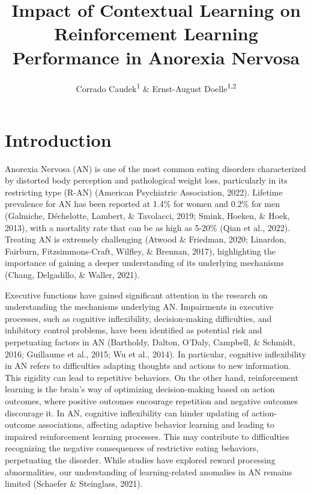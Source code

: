 \documentclass[
  man,floatsintext]{apa6}
\title{Impact of Contextual Learning on Reinforcement Learning Performance in Anorexia Nervosa}
\author{Corrado Caudek\textsuperscript{1} \& Ernst-August Doelle\textsuperscript{1,2}}
\date{}
\affiliation{\vspace{0.5cm}\textsuperscript{1} Wilhelm-Wundt-University\\\textsuperscript{2} Konstanz Business School}
\begin{document}
\maketitle

\hypertarget{introduction}{%
\section{Introduction}\label{introduction}}

Anorexia Nervosa (AN) is one of the most common eating disorders characterized by distorted body perception and pathological weight loss, particularly in its restricting type (R-AN) (American Psychiatric Association, 2022). Lifetime prevalence for AN has been reported at 1.4\% for women and 0.2\% for men (Galmiche, Déchelotte, Lambert, \& Tavolacci, 2019; Smink, Hoeken, \& Hoek, 2013), with a mortality rate that can be as high as 5-20\% (Qian et al., 2022). Treating AN is extremely challenging (Atwood \& Friedman, 2020; Linardon, Fairburn, Fitzsimmons-Craft, Wilfley, \& Brennan, 2017), highlighting the importance of gaining a deeper understanding of its underlying mechanisms (Chang, Delgadillo, \& Waller, 2021).

Executive functions have gained significant attention in the research on understanding the mechanisms underlying AN. Impairments in executive processes, such as cognitive inflexibility, decision-making difficulties, and inhibitory control problems, have been identified as potential risk and perpetuating factors in AN (Bartholdy, Dalton, O'Daly, Campbell, \& Schmidt, 2016; Guillaume et al., 2015; Wu et al., 2014). In particular, cognitive inflexibility in AN refers to difficulties adapting thoughts and actions to new information. This rigidity can lead to repetitive behaviors. On the other hand, reinforcement learning is the brain's way of optimizing decision-making based on action outcomes, where positive outcomes encourage repetition and negative outcomes discourage it. In AN, cognitive inflexibility can hinder updating of action-outcome associations, affecting adaptive behavior learning and leading to impaired reinforcement learning processes. This may contribute to difficulties recognizing the negative consequences of restrictive eating behaviors, perpetuating the disorder. While studies have explored reward processing abnormalities, our understanding of learning-related anomalies in AN remains limited (Schaefer \& Steinglass, 2021).
\end{document}
